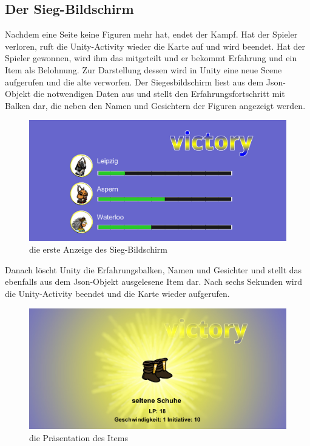 \documentclass[extern,palatino]{cgBA}
\begin{document}
\subsection{Der Sieg-Bildschirm}
Nachdem eine Seite keine Figuren mehr hat, endet der Kampf. Hat der Spieler verloren, ruft die Unity-Activity wieder die Karte auf und wird beendet. Hat der Spieler gewonnen, wird ihm das mitgeteilt und er bekommt Erfahrung und ein Item als Belohnung. Zur Darstellung dessen wird in Unity eine neue Scene aufgerufen und die alte verworfen. Der Siegesbildschirm liest aus dem Json-Objekt die notwendigen Daten aus und stellt den Erfahrungsfortschritt mit Balken dar, die neben den Namen und Gesichtern der Figuren angezeigt werden. 
\begin{figure}[H]
		\centering
		\includegraphics[width=1\textwidth]{sieg1}
		\caption{die erste Anzeige des Sieg-Bildschirm}
\end{figure}
Danach löscht Unity die Erfahrungsbalken, Namen und Gesichter und stellt das ebenfalls aus dem Json-Objekt ausgelesene Item dar. Nach sechs Sekunden wird die Unity-Activity beendet und die Karte wieder aufgerufen.
\begin{figure}[H]
		\centering
		\includegraphics[width=1\textwidth]{sieg2}
		\caption{die Präsentation des Items}
\end{figure}
\newpage
\end{document}
